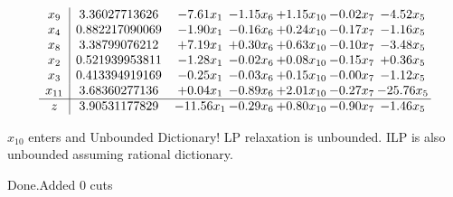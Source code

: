 \documentclass[8pt]{article}
\begin{document}
 \[\begin{array}{c| c c@{\hskip 2pt} c@{\hskip 2pt} c@{\hskip 2pt} c@{\hskip 2pt} c@{\hskip 2pt} }
 x_{9}   &  3.36027713626 & -7.61 x_{1} & -1.15 x_{6} & +  1.15 x_{10} & -0.02 x_{7} & -4.52 x_{5}\\
 x_{4}   &  0.882217090069 & -1.90 x_{1} & -0.16 x_{6} & +  0.24 x_{10} & -0.17 x_{7} & -1.16 x_{5}\\
 x_{8}   &  3.38799076212 & +  7.19 x_{1} & +  0.30 x_{6} & +  0.63 x_{10} & -0.10 x_{7} & -3.48 x_{5}\\
 x_{2}   &  0.521939953811 & -1.28 x_{1} & -0.02 x_{6} & +  0.08 x_{10} & -0.15 x_{7} & +  0.36 x_{5}\\
 x_{3}   &  0.413394919169 & -0.25 x_{1} & -0.03 x_{6} & +  0.15 x_{10} & -0.00 x_{7} & -1.12 x_{5}\\
 x_{11}   &  3.68360277136 & +  0.04 x_{1} & -0.89 x_{6} & +  2.01 x_{10} & -0.27 x_{7} & -25.76 x_{5}\\
\hline
z    &  3.90531177829 & -11.56 x_{1} & -0.29 x_{6} & +  0.80 x_{10} & -0.90 x_{7} & -1.46 x_{5}\\
\end{array}\]


 $ x_{10} $ enters and Unbounded Dictionary!
 LP relaxation is unbounded. ILP is also unbounded assuming rational dictionary. 

Done.Added 0 cuts 
\end{document}
